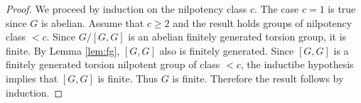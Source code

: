 \begin{proof}
	We proceed by induction on the nilpotency class $c$. The case $c=1$ is true since $G$ is abelian. Assume 
	that $c\geq 2$ and the result holds groups of nilpotency class $<c$.  Since $G/[G,G]$ is an abelian finitely generated torsion group, it is finite. By Lemma \ref{lem:fg}, $[G,G]$ also is finitely generated. Since $[G,G]$ is a finitely generated torsion nilpotent group of class $<c$, the inductibe hypothesis implies that $[G,G]$ is finite. Thus $G$
	is finite. Therefore the result follows by induction.
\end{proof}

%

%
%
%

